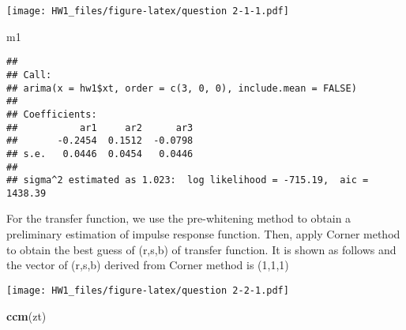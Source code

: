 \documentclass[]{article}
\newenvironment{Shaded}{\begin{snugshade}}{\end{snugshade}}
\newcommand{\KeywordTok}[1]{\textcolor[rgb]{0.13,0.29,0.53}{\textbf{#1}}}
\newcommand{\DataTypeTok}[1]{\textcolor[rgb]{0.13,0.29,0.53}{#1}}
\newcommand{\DecValTok}[1]{\textcolor[rgb]{0.00,0.00,0.81}{#1}}
\newcommand{\StringTok}[1]{\textcolor[rgb]{0.31,0.60,0.02}{#1}}
\newcommand{\OperatorTok}[1]{\textcolor[rgb]{0.81,0.36,0.00}{\textbf{#1}}}
\newcommand{\NormalTok}[1]{#1}
\begin{document}
\texttt{[image: HW1\_files/figure-latex/question 2-1-1.pdf]}

\begin{Shaded}
\begin{Highlighting}[]
\NormalTok{m1}
\end{Highlighting}
\end{Shaded}

\begin{verbatim}
## 
## Call:
## arima(x = hw1$xt, order = c(3, 0, 0), include.mean = FALSE)
## 
## Coefficients:
##           ar1     ar2      ar3
##       -0.2454  0.1512  -0.0798
## s.e.   0.0446  0.0454   0.0446
## 
## sigma^2 estimated as 1.023:  log likelihood = -715.19,  aic = 1438.39
\end{verbatim}

For the transfer function, we use the pre-whitening method to obtain a
preliminary estimation of impulse response function. Then, apply Corner
method to obtain the best guess of (r,s,b) of transfer function. It is
shown as follows and the vector of (r,s,b) derived from Corner method is
(1,1,1)

\begin{Shaded}
\end{Shaded}

\texttt{[image: HW1\_files/figure-latex/question 2-2-1.pdf]}

\begin{Shaded}
\begin{Highlighting}[]
\KeywordTok{ccm}\NormalTok{(zt)}
\end{Highlighting}
\end{Shaded}
\end{document}
